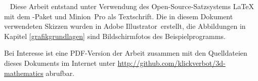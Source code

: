 \thispagestyle{plain}
\clearpage
~\vfill
\scriptsize
Diese Arbeit entstand unter Verwendung des Open-Source-Satzsystems \LaTeX{} mit dem \KOMAScript-Paket und Minion~Pro als Textschrift.
Die in diesem Dokument verwendeten Skizzen wurden in Adobe Illustrator\textregistered\ erstellt, die Abbildungen in Kapitel \ref{grafikgrundlagen} sind Bildschirmfotos des Beispielprogramms.

Bei Interesse ist eine PDF-Version der Arbeit zusammen mit den Quelldateien dieses Dokuments im Internet unter \url{http://github.com/klickverbot/3d-mathematics} abrufbar.